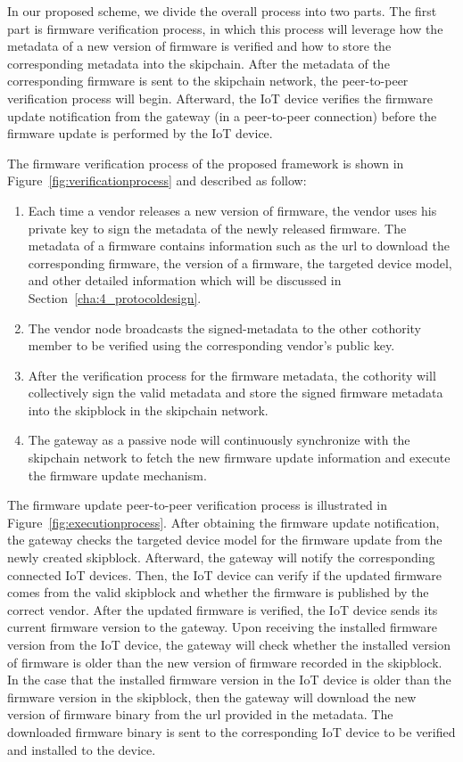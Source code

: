 In our proposed scheme, we divide the overall process into two parts. The first part is firmware verification process, in which this process will leverage how the metadata of a new version of firmware is verified and how to store the corresponding metadata into the skipchain. After the metadata of the corresponding firmware is sent to the skipchain network, the peer-to-peer verification process will begin. Afterward, the IoT device verifies the firmware update notification from the gateway (in a peer-to-peer connection) before the firmware update is performed by the IoT device.

The firmware verification process of the proposed framework is shown in Figure~\ref{fig:verificationprocess} and described as follow:
~\begin{enumerate}
	\item Each time a vendor releases a new version of firmware, the vendor uses his private key to sign the metadata of the newly released firmware. The metadata of a firmware contains information such as the url to download the corresponding firmware, the version of a firmware, the targeted device model, and other detailed information which will be discussed in Section~\ref{cha:4_protocoldesign}.
	\item The vendor node broadcasts the signed-metadata to the other cothority member to be verified using the corresponding vendor's public key.
	\item After the verification process for the firmware metadata, the cothority will collectively sign the valid metadata and store the signed firmware metadata into the skipblock in the skipchain network.
	\item The gateway as a passive node will continuously synchronize with the skipchain network to fetch the new firmware update information and execute the firmware update mechanism.
\end{enumerate}

The firmware update peer-to-peer verification process is illustrated in Figure~\ref{fig:executionprocess}. After obtaining the firmware update notification, the gateway checks the targeted device model for the firmware update from the newly created skipblock. Afterward, the gateway will notify the corresponding connected IoT devices. Then, the IoT device can verify if the updated firmware comes from the valid skipblock and whether the firmware is published by the correct vendor. After the updated firmware is verified, the IoT device sends its current firmware version to the gateway. Upon receiving the installed firmware version from the IoT device, the gateway will check whether the installed version of firmware is older than the new version of firmware recorded in the skipblock. In the case that the installed firmware version in the IoT device is older than the firmware version in the skipblock, then the gateway will download the new version of firmware binary from the url provided in the metadata. The downloaded firmware binary is sent to the corresponding IoT device to be verified and installed to the device.

